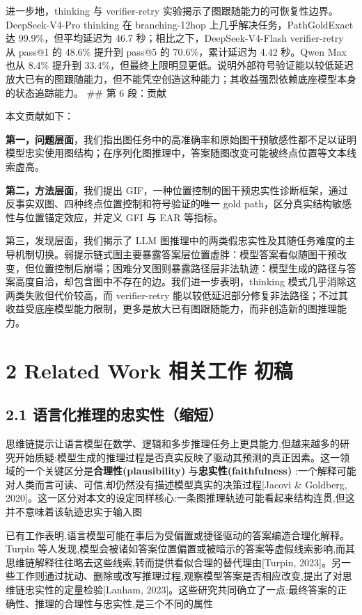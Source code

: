 \documentclass[
  11pt,
]{article}
\begin{document}
进一步地，thinking 与 verifier-retry
实验揭示了图跟随能力的可恢复性边界。DeepSeek-V4-Pro thinking 在
branching-12hop 上几乎解决任务，PathGoldExact 达 99.9\%，但平均延迟为
46.7 秒；相比之下，DeepSeek-V4-Flash verifier-retry 从 pass@1 的 48.6\%
提升到 pass@5 的 70.6\%，累计延迟为 4.42 秒。Qwen Max 也从 8.4\% 提升到
33.4\%，但最终上限明显更低。说明外部符号验证能以较低延迟放大已有的图跟随能力，但不能凭空创造这种能力；其收益强烈依赖底座模型本身的状态追踪能力。
\#\# 第 6 段：贡献

本文贡献如下：

\textbf{第一，问题层面}，我们指出图任务中的高准确率和原始图干预敏感性都不足以证明模型忠实使用图结构；在序列化图推理中，答案随图改变可能被终点位置等文本线索虚高。

\textbf{第二，方法层面}，我们提出
GIF，一种位置控制的图干预忠实性诊断框架，通过反事实双图、四种终点位置控制和符号验证的唯一
gold path，区分真实结构敏感性与位置锚定效应，并定义 GFI 与 EAR 等指标。

第三，发现层面，我们揭示了 LLM
图推理中的两类假忠实性及其随任务难度的主导机制切换。弱提示链式图主要暴露答案层位置虚胖：模型答案看似随图干预改变，但位置控制后崩塌；困难分叉图则暴露路径层非法轨迹：模型生成的路径与答案高度自洽，却包含图中不存在的边。我们进一步表明，thinking
模式几乎消除这两类失败但代价较高，而 verifier-retry
能以较低延迟部分修复非法路径；不过其收益受底座模型能力限制，更多是放大已有图跟随能力，而非创造新的图推理能力。

\section{2 Related Work 相关工作
初稿}\label{related-work-ux76f8ux5173ux5de5ux4f5c-ux521dux7a3f}

\subsection{2.1
语言化推理的忠实性（缩短）}\label{ux8bedux8a00ux5316ux63a8ux7406ux7684ux5fe0ux5b9eux6027ux7f29ux77ed}

思维链提示让语言模型在数学、逻辑和多步推理任务上更具能力,但越来越多的研究开始质疑:模型生成的推理过程是否真实反映了驱动其预测的真正因素。这一领域的一个关键区分是\textbf{合理性(plausibility)}
与\textbf{忠实性(faithfulness)}
:一个解释可能对人类而言可读、可信,却仍然没有描述模型真实的决策过程{[}Jacovi
\& Goldberg,
2020{]}。这一区分对本文的设定同样核心:一条图推理轨迹可能看起来结构连贯,但这并不意味着该轨迹忠实于输入图

已有工作表明,语言模型可能在事后为受偏置或捷径驱动的答案编造合理化解释。Turpin
等人发现,模型会被诸如答案位置偏置或被暗示的答案等虚假线索影响,而其思维链解释往往略去这些线索,转而提供看似合理的替代理由{[}Turpin,
2023{]}。另一些工作则通过扰动、删除或改写推理过程,观察模型答案是否相应改变,提出了对思维链忠实性的定量检验{[}Lanham,
2023{]}。这些研究共同确立了一点:最终答案的正确性、推理的合理性与忠实性,是三个不同的属性
\end{document}
